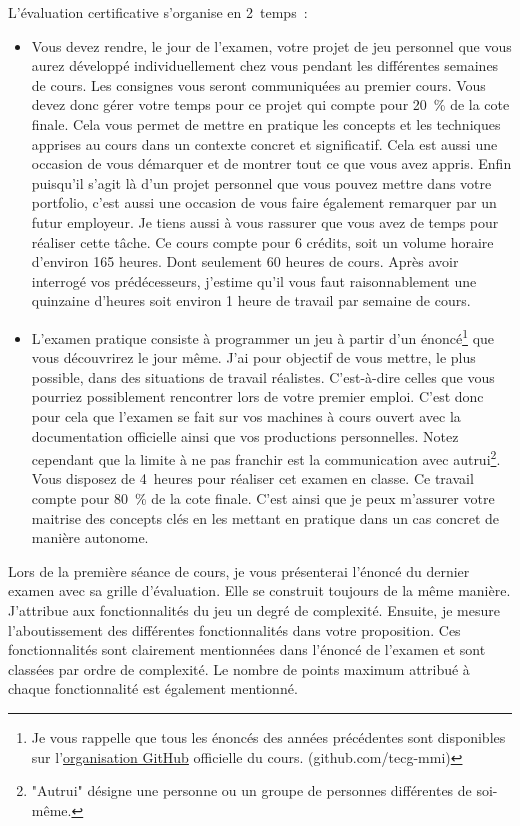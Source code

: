 \label{eval_certificative}
L’évaluation certificative s'organise en 2~temps~:
\begin{itemize}
    \item Vous devez rendre, le jour de l'examen, votre projet de jeu personnel que vous aurez développé individuellement chez vous pendant les différentes semaines de cours. Les consignes vous seront communiquées au premier cours. Vous devez donc gérer votre temps pour ce projet qui compte pour 20~\% de la cote finale. Cela vous permet de mettre en pratique les concepts et les techniques apprises au cours dans un contexte concret et significatif. Cela est aussi une occasion de vous démarquer et de montrer tout ce que vous avez appris. Enfin puisqu'il s'agit là d'un projet personnel que vous pouvez mettre dans votre portfolio, c'est aussi une occasion de vous faire également remarquer par un futur employeur. Je tiens aussi à vous rassurer que vous avez de temps pour réaliser cette tâche. Ce cours compte pour 6 crédits, soit un volume horaire d'environ 165 heures. Dont seulement 60 heures de cours. Après avoir interrogé vos prédécesseurs, j'estime qu'il vous faut raisonnablement une quinzaine d'heures soit environ 1 heure de travail par semaine de cours.
    \item L'examen pratique consiste à programmer un jeu à partir d'un énoncé\footnote{Je vous rappelle que tous les énoncés des années précédentes sont disponibles sur l'\href{https://github.com/tecg-mmi}{organisation GitHub} officielle du cours. (github.com/tecg-mmi)} que vous découvrirez le jour même. J'ai pour objectif de vous mettre, le plus possible, dans des situations de travail réalistes. C'est-à-dire celles que vous pourriez possiblement rencontrer lors de votre premier emploi. C'est donc pour cela que l'examen se fait sur vos machines à cours ouvert avec la documentation officielle ainsi que vos productions personnelles. Notez cependant que la limite à ne pas franchir est la communication avec autrui\footnote{"Autrui" désigne une personne ou un groupe de personnes différentes de soi-même.}. Vous disposez de 4~heures pour réaliser cet examen en classe. Ce travail compte pour 80~\% de la cote finale. C'est ainsi que je peux m'assurer votre maitrise des concepts clés en les mettant en pratique dans un cas concret de manière autonome.
\end{itemize}
Lors de la première séance de cours, je vous présenterai l'énoncé du dernier examen avec sa grille d'évaluation. Elle se construit toujours de la même manière. J'attribue aux fonctionnalités du jeu un degré de complexité. Ensuite, je mesure l'aboutissement des différentes fonctionnalités dans votre proposition. Ces fonctionnalités sont clairement mentionnées dans l'énoncé de l'examen et sont classées par ordre de complexité. Le nombre de points maximum attribué à chaque fonctionnalité est également mentionné. \\
